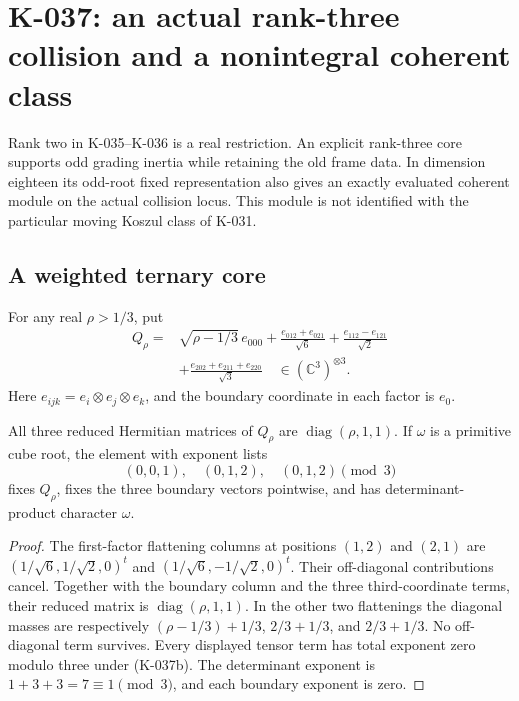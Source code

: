 \section{K-037: an actual rank-three collision and a nonintegral coherent class}

Rank two in K-035--K-036 is a real restriction. An explicit
rank-three core supports odd grading inertia while retaining
the old frame data. In dimension eighteen its odd-root fixed
representation also gives an exactly evaluated coherent module
on the actual collision locus. This module is not identified
with the particular moving Koszul class of K-031.

\subsection*{A weighted ternary core}

For any real $\rho>1/3$, put
\[
\begin{aligned}
 Q_\rho={}&\sqrt{\rho-1/3}\,e_{000}
       +\frac{e_{012}+e_{021}}{\sqrt6}
       +\frac{e_{112}-e_{121}}{\sqrt2}\\
       &+\frac{e_{202}+e_{211}+e_{220}}{\sqrt3}
             \quad\in(\mathbb C^3)^{\otimes3}.
\end{aligned}                                             \tag{K-037a}
\]
Here $e_{ijk}=e_i\otimes e_j\otimes e_k$, and the boundary
coordinate in each factor is $e_0$.

\begin{lemma}[K-037a]
All three reduced Hermitian matrices of $Q_\rho$ are
$\operatorname{diag}(\rho,1,1)$. If $\omega$ is a primitive
cube root, the element with exponent lists
\[
                  (0,0,1),\quad(0,1,2),\quad(0,1,2)
                          \pmod3                         \tag{K-037b}
\]
fixes $Q_\rho$, fixes the three boundary vectors pointwise,
and has determinant-product character $\omega$.
\end{lemma}

\begin{proof}
The first-factor flattening columns at positions $(1,2)$ and
$(2,1)$ are $(1/\sqrt6,1/\sqrt2,0)^t$ and
$(1/\sqrt6,-1/\sqrt2,0)^t$. Their off-diagonal contributions
cancel. Together with the boundary column and the three
third-coordinate terms, their reduced matrix is
$\operatorname{diag}(\rho,1,1)$. In the other two flattenings
the diagonal masses are respectively
$(\rho-1/3)+1/3$, $2/3+1/3$, and $2/3+1/3$.
No off-diagonal term survives. Every displayed tensor term
has total exponent zero modulo three under (K-037b).
The determinant exponent is $1+3+3=7\equiv1\pmod3$, and
each boundary exponent is zero.
\end{proof}

